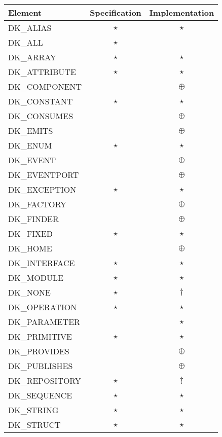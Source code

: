 \begin{table}
\begin{minifbox}
\centering
\begin{tabular}{lcc}
Element           & Specification & Implementation \\ \hline
DK\_ALIAS         & $\star$ & $\star$    \\
DK\_ALL           & $\star$ &            \\
DK\_ARRAY         & $\star$ & $\star$    \\
DK\_ATTRIBUTE     & $\star$ & $\star$    \\
DK\_COMPONENT     &         & $\oplus$   \\ \hline
DK\_CONSTANT      & $\star$ & $\star$    \\
DK\_CONSUMES      &         & $\oplus$   \\
DK\_EMITS         &         & $\oplus$   \\
DK\_ENUM          & $\star$ & $\star$    \\
DK\_EVENT         &         & $\oplus$   \\ \hline
DK\_EVENTPORT     &         & $\oplus$   \\
DK\_EXCEPTION     & $\star$ & $\star$    \\
DK\_FACTORY       &         & $\oplus$   \\
DK\_FINDER        &         & $\oplus$   \\
DK\_FIXED         & $\star$ & $\star$    \\ \hline
DK\_HOME          &         & $\oplus$   \\
DK\_INTERFACE     & $\star$ & $\star$    \\
DK\_MODULE        & $\star$ & $\star$    \\
DK\_NONE          & $\star$ & $\dagger$  \\
DK\_OPERATION     & $\star$ & $\star$    \\ \hline
DK\_PARAMETER     &         & $\star$    \\
DK\_PRIMITIVE     & $\star$ & $\star$    \\
DK\_PROVIDES      &         & $\oplus$   \\
DK\_PUBLISHES     &         & $\oplus$   \\
DK\_REPOSITORY    & $\star$ & $\ddagger$ \\ \hline
DK\_SEQUENCE      & $\star$ & $\star$    \\
DK\_STRING        & $\star$ & $\star$    \\
DK\_STRUCT        & $\star$ & $\star$    \\

\end{tabular}
\end{minifbox}
\end{table}
